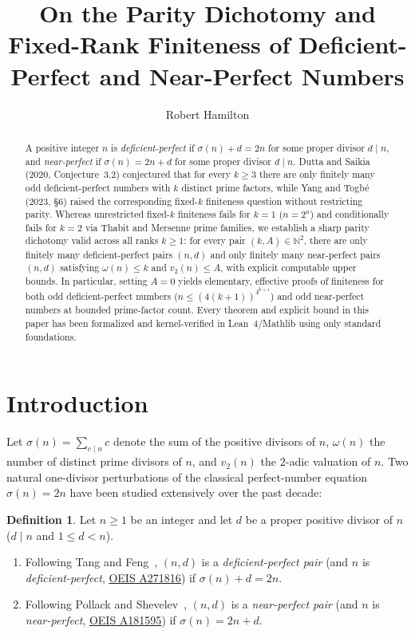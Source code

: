 \documentclass[11pt]{amsart}
\title[Parity Dichotomy and Fixed-Rank Finiteness]{On the Parity Dichotomy and Fixed-Rank Finiteness of Deficient-Perfect and Near-Perfect Numbers}
\author{Robert Hamilton}
\theoremstyle{definition}
\newtheorem{definition}[theorem]{Definition}
\theoremstyle{remark}
\begin{document}
\begin{abstract}
A positive integer $n$ is \emph{deficient-perfect} if $\sigma(n) + d = 2n$ for some proper divisor $d \mid n$, and \emph{near-perfect} if $\sigma(n) = 2n + d$ for some proper divisor $d \mid n$. Dutta and Saikia (2020, Conjecture~3.2) conjectured that for every $k \ge 3$ there are only finitely many odd deficient-perfect numbers with $k$ distinct prime factors, while Yang and Togb\'e (2023, \S 6) raised the corresponding fixed-$k$ finiteness question without restricting parity. Whereas unrestricted fixed-$k$ finiteness fails for $k = 1$ ($n = 2^a$) and conditionally fails for $k = 2$ via Thabit and Mersenne prime families, we establish a sharp parity dichotomy valid across all ranks $k \ge 1$: for every pair $(k, A) \in \mathbb{N}^2$, there are only finitely many deficient-perfect pairs $(n, d)$ and only finitely many near-perfect pairs $(n, d)$ satisfying $\omega(n) \le k$ and $v_2(n) \le A$, with explicit computable upper bounds. In particular, setting $A = 0$ yields elementary, effective proofs of finiteness for both odd deficient-perfect numbers ($n \le (4(k+1))^{4^{k+1}}$) and odd near-perfect numbers at bounded prime-factor count. Every theorem and explicit bound in this paper has been formalized and kernel-verified in Lean~4/Mathlib using only standard foundations.
\end{abstract}

\maketitle

\section{Introduction}

Let $\sigma(n) = \sum_{c \mid n} c$ denote the sum of the positive divisors of $n$, $\omega(n)$ the number of distinct prime divisors of $n$, and $v_2(n)$ the $2$-adic valuation of $n$. Two natural one-divisor perturbations of the classical perfect-number equation $\sigma(n) = 2n$ have been studied extensively over the past decade:

\begin{definition}\label{def:classes}
Let $n \ge 1$ be an integer and let $d$ be a proper positive divisor of $n$ ($d \mid n$ and $1 \le d < n$).
\begin{enumerate}
  \item Following Tang and Feng~\cite{TangFeng2014}, $(n, d)$ is a \emph{deficient-perfect pair} (and $n$ is \emph{deficient-perfect}, \href{https://oeis.org/A271816}{OEIS A271816}) if $\sigma(n) + d = 2n$.
  \item Following Pollack and Shevelev~\cite{PollackShevelev2012}, $(n, d)$ is a \emph{near-perfect pair} (and $n$ is \emph{near-perfect}, \href{https://oeis.org/A181595}{OEIS A181595}) if $\sigma(n) = 2n + d$.
\end{enumerate}
\end{definition}
\end{document}
